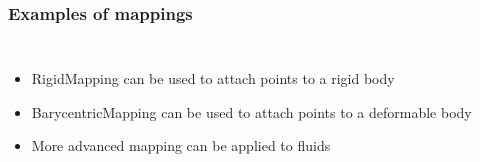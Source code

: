 \documentclass[a4paper,compress]{beamer}
\begin{document}
\begin{frame}
\frametitle{Examples of mappings}
\begin{columns}
\begin{itemize}
 \item<1-> RigidMapping can be used to attach points to a rigid body

 \item<3-> BarycentricMapping can be used to attach points to a deformable body

\item<5-> More advanced mapping can be applied to fluids


\end{itemize}
\end{columns}
\end{frame}
\end{document}
